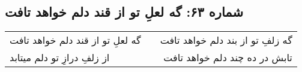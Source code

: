 \begin{center}
\section*{شماره ۶۳: گه لعلِ تو از قند دلم خواهد تافت}
\label{sec:063}
\begin{longtable}{l p{0.5cm} r}
گه لعلِ تو از قند دلم خواهد تافت
&&
گه زلفِ تو از بند دلم خواهد تافت
\\
از زلفِ درازِ تو دلم میتابد
&&
تابش در ده چند دلم خواهد تافت
\\
\end{longtable}
\end{center}
